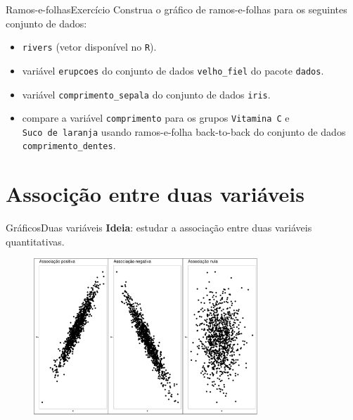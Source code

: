 \documentclass[
  10pt,
  ignorenonframetext,
]{beamer}
\providecommand{\tightlist}{%
  \setlength{\itemsep}{0pt}\setlength{\parskip}{0pt}}\usepackage{longtable,booktabs,array}
\begin{document}
\begin{frame}[fragile]{Ramos-e-folhas\newline Exercício}
\protect\hypertarget{ramos-e-folhasexercuxedcio}{}
Construa o gráfico de ramos-e-folhas para os seguintes conjunto de
dados:

\begin{itemize}
\tightlist
\item
  \texttt{rivers} (vetor disponível no \texttt{R}).
\item
  variável \texttt{erupcoes} do conjunto de dados \texttt{velho\_fiel}
  do pacote \texttt{dados}.
\item
  variável \texttt{comprimento\_sepala} do conjunto de dados
  \texttt{iris}.
\item
  compare a variável \texttt{comprimento} para os grupos
  \texttt{Vitamina\ C} e \texttt{Suco\ de\ laranja} usando ramos-e-folha
  back-to-back do conjunto de dados \texttt{comprimento\_dentes}.
\end{itemize}
\end{frame}

\hypertarget{associuxe7uxe3o-entre-duas-variuxe1veis}{%
\section{Associção entre duas
variáveis}\label{associuxe7uxe3o-entre-duas-variuxe1veis}}

\begin{frame}{Gráficos\newline Duas variáveis}
\protect\hypertarget{gruxe1ficosduas-variuxe1veis}{}
\textbf{Ideia}: estudar a associação entre duas variáveis quantitativas.

\begin{figure}

{\centering \includegraphics[width=0.75\textwidth,height=\textheight]{exploracao-visualizacao_files/figure-beamer/unnamed-chunk-96-1.pdf}

}

\end{figure}
\end{frame}
\end{document}
